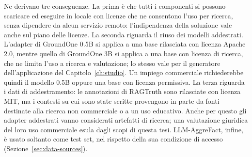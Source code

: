 Ne derivano tre conseguenze. La prima è che tutti i componenti si possono scaricare ed eseguire in locale con licenze
che ne consentono l'uso per ricerca, senza dipendere da alcun servizio remoto: l'indipendenza della soluzione vale anche
sul piano delle licenze. La seconda riguarda il riuso dei modelli addestrati. L'adapter di GroundOne 0.5B si applica a
una base rilasciata con licenza Apache 2.0, mentre quello di GroundOne 3B si applica a una base con licenza di
ricerca, che ne limita l'uso a ricerca e valutazione; lo stesso vale per il generatore dell'applicazione del Capitolo~\ref{ch:studio}.
Un impiego commerciale richiederebbe quindi il modello 0.5B oppure una base con licenza permissiva. La terza riguarda i
dati di addestramento: le annotazioni di RAGTruth sono rilasciate con licenza MIT, ma i contesti su cui sono state
scritte provengono in parte da fonti destinate alla ricerca non commerciale o a un uso educativo. Anche per questo gli
adapter addestrati vanno considerati artefatti di ricerca; una valutazione giuridica del loro uso commerciale esula
dagli scopi di questa tesi. LLM-AggreFact, infine, è usato soltanto come test set, nel rispetto della sua condizione di
accesso (Sezione~\ref{sec:data-sources}).
